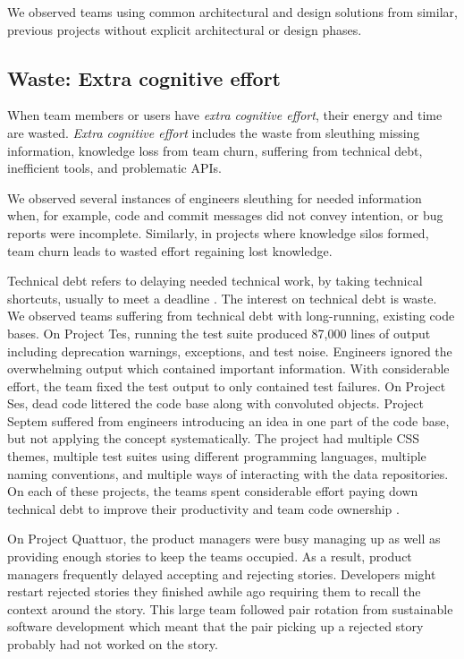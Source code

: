 We observed teams using common architectural and design solutions from similar, previous projects without explicit architectural or design phases.


\subsection{Waste: Extra cognitive effort}
When team members or users have \textit{extra cognitive effort}, their energy and time are wasted. \textit{Extra cognitive effort} includes the waste from sleuthing missing information, knowledge loss from team churn, suffering from technical debt, inefficient tools, and problematic APIs.


We observed several instances of engineers sleuthing for needed information when, for example, code and commit messages did not convey intention, or bug reports were incomplete. Similarly, in projects where knowledge silos formed, team churn leads to wasted effort regaining lost knowledge. 
 
Technical debt refers to delaying needed technical work, by taking technical shortcuts, usually to meet a deadline \cite{McConnellTechnicalDebt}. The interest on technical debt is waste. We observed teams suffering from technical debt with long-running, existing code bases. On Project Tes, running the test suite produced 87,000 lines of output including deprecation warnings, exceptions, and test noise. Engineers ignored the overwhelming output which contained important information. With considerable effort, the team fixed the test output to only contained test failures. On Project Ses, dead code littered the code base along with convoluted objects. Project Septem suffered from engineers introducing an idea in one part of the code base, but not applying the concept systematically. The project had multiple CSS themes, multiple test suites using different programming languages, multiple naming conventions, and multiple ways of interacting with the data repositories. On each of these projects, the teams spent considerable effort paying down technical debt to improve their productivity and team code ownership \cite{SedanoTeamCodeOwnership}.  


On Project Quattuor, the product managers were busy managing up as well as providing enough stories to keep the teams occupied. As a result, product managers frequently delayed accepting and rejecting stories. Developers might restart rejected stories they finished awhile ago requiring them to recall the context around the story. This large team followed pair rotation from sustainable software development \cite{SedanoSustainableSoftware} which meant that the pair picking up a rejected story probably had not worked on the story.


